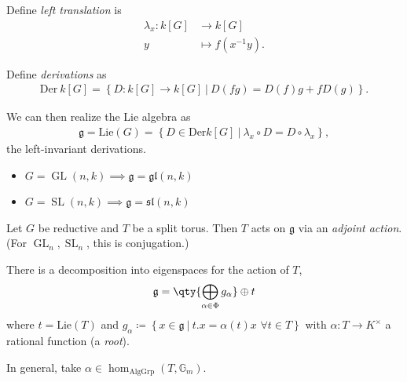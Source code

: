\begin{definition}

Define \emph{left translation} is
\begin{align*}  
\lambda_x: k[G] &\to k[G] \\
y &\mapsto f(x^{-1} y)
.\end{align*}

Define \emph{derivations} as
\begin{align*}  
\mathrm{Der} ~k[G] = \left\{{D: k[G] \to k[G] {~\mathrel{\Big|}~}D(fg) = D(f) g + f D(g) }\right\}
.\end{align*}

We can then realize the Lie algebra as
\begin{align*}  
{\mathfrak{g}}= \mathrm{Lie}(G) = \left\{{D\in \mathrm{Der} k[G] {~\mathrel{\Big|}~}\lambda_x \circ D = D\circ \lambda_x}\right\}
,\end{align*}
the left-invariant derivations.

\end{definition}

\begin{example}

\hfill

\begin{itemize}
\tightlist
\item
  \(G = \operatorname{GL}(n, k) \implies{\mathfrak{g}}= {\mathfrak{gl}}(n, k)\)
\item
  \(G = {\operatorname{SL}}(n, k) \implies{\mathfrak{g}}= {\mathfrak{sl}}(n, k)\)
\end{itemize}

\end{example}

Let \(G\) be reductive and \(T\) be a split torus. Then \(T\) acts on
\({\mathfrak{g}}\) via an \emph{adjoint action}. (For
\(\operatorname{GL}_n, {\operatorname{SL}}_n\), this is conjugation.)

There is a decomposition into eigenspaces for the action of \(T\),
\begin{align*}  
{\mathfrak{g}}= \qty{\bigoplus_{\alpha\in \Phi} g_\alpha} \oplus t
\end{align*}
where \(t = \mathrm{Lie}(T)\) and
\(g_\alpha \coloneqq\left\{{x\in {\mathfrak{g}}{~\mathrel{\Big|}~}t.x = \alpha(t) x\,\, \forall t\in T}\right\}\)
with \(\alpha: T\to K^{\times}\) a rational function (a \emph{root}).

In general, take \(\alpha\in\hom_{\text{AlgGrp}}(T, {\mathbb{G}}_m)\).

